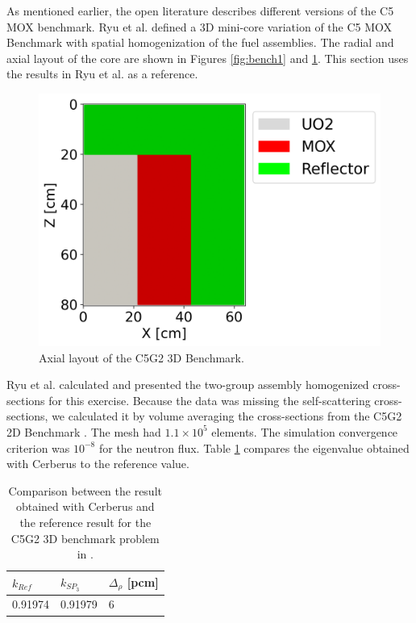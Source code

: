 \documentclass{anstrans}
\begin{document}
As mentioned earlier, the open literature describes different versions of the C5 MOX benchmark.
Ryu et al. \cite{ryu_finite_2013} defined a 3D mini-core variation of the C5 MOX Benchmark with spatial homogenization of the fuel assemblies.
The radial and axial layout of the core are shown in Figures \ref{fig:bench1} and \ref{fig:c5g2-3d}.
This section uses the results in Ryu et al. as a reference.


\begin{figure}[h] %
    \centering
    \includegraphics[width=0.77\linewidth]{figures/geo-xz2.png}
    \hfill
    \caption{Axial layout of the C5G2 3D Benchmark.}
    \label{fig:c5g2-3d}
\end{figure}

Ryu et al. calculated and presented the two-group assembly homogenized cross-sections for this exercise.
Because the data was missing the self-scattering cross-sections, we calculated it by volume averaging the cross-sections from the C5G2 2D Benchmark \cite{cavarec_benchmark_1994}.
The mesh had $1.1 \times 10^{5}$ elements.
The simulation convergence criterion was $10^{-8}$ for the neutron flux.
Table \ref{tab:keff-4th} compares the eigenvalue obtained with Cerberus to the reference value.

\begin{table}[htbp!]
    \centering
    \caption{Comparison between the result obtained with Cerberus and the reference result for the C5G2 3D benchmark problem in \cite{ryu_finite_2013}.}
    \label{tab:keff-4th}
    \begin{tabular}{lll}
    \toprule
        $k_{Ref}$   & $k_{SP_3}$    & $\Delta_{\rho}$ [pcm]   \\
    \midrule
        0.91974     & 0.91979       & 6                 \\
    \bottomrule
    \end{tabular}
\end{table}
\end{document}
